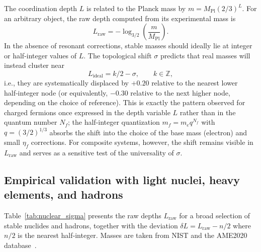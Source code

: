 \documentclass[12pt,a4paper]{article}
\begin{document}
The coordination depth \(L\) is related to the Planck mass by \(m = M_{\mathrm{Pl}}(2/3)^L\). For an arbitrary object, the raw depth computed from its experimental mass is
\begin{equation}
	L_{\mathrm{raw}} = -\log_{3/2}\!\left(\frac{m}{M_{\mathrm{Pl}}}\right).
\end{equation}
In the absence of resonant corrections, stable masses should ideally lie at integer or half‑integer values of \(L\). The topological shift \(\sigma\) predicts that real masses will instead cluster near
\[
L_{\mathrm{ideal}} = k/2 - \sigma, \qquad k\in\mathbb{Z},
\]
i.e., they are systematically displaced by \(+0.20\) relative to the nearest lower half‑integer node (or equivalently, \(-0.30\) relative to the next higher node, depending on the choice of reference). This is exactly the pattern observed for charged fermions once expressed in the depth variable \(L\) rather than in the quantum number \(N_f\); the half‑integer quantization \(m_f = m_e q^{N_f}\) with \(q=(3/2)^{1/3}\) absorbs the shift into the choice of the base mass (electron) and small \(\eta_f\) corrections. For composite systems, however, the shift remains visible in \(L_{\mathrm{raw}}\) and serves as a sensitive test of the universality of \(\sigma\).

\subsection{Empirical validation with light nuclei, heavy elements, and hadrons}

Table~\ref{tab:nuclear_sigma} presents the raw depths \(L_{\mathrm{raw}}\) for a broad selection of stable nuclides and hadrons, together with the deviation \(\delta L = L_{\mathrm{raw}} - n/2\) where \(n/2\) is the nearest half‑integer. Masses are taken from NIST and the AME2020 database~\cite{AME2020}.
\end{document}
